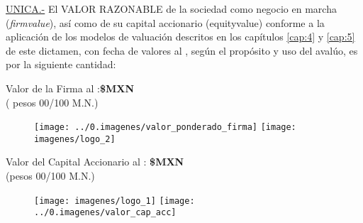 \textcolor{principal}{\underline{UNICA.-}} El \textcolor{principal}{VALOR RAZONABLE} de la sociedad \textcolor{principal}{\empresaSolicitante} como negocio en marcha (\textit{\gls{firmvalue}}), as\'i como de su capital accionario (\gls{equityvalue}) conforme a la aplicaci\'on de los modelos de valuaci\'on descritos en los cap\'itulos \ref{cap:4} y \ref{cap:5}  de este dictamen, con fecha de valores al \fechaValores, seg\'un el prop\'osito y uso del aval\'uo, es por la siguiente cantidad:\\
\begin{center}
\textcolor{principal}{Valor de la Firma al \fechaValoresCorto:}\textbf{\$\valorFirma MXN}\\

(\textcolor{secundario}{\valorFirmaLetra{} pesos 00/100 M.N.})

\begin{figure}[H]
\centering
\texttt{[image: ../0.imagenes/valor\_ponderado\_firma]}\hspace{.5cm} \texttt{[image: imagenes/logo\_2]}\\
\end{figure}


\textcolor{principal}{Valor del Capital Accionario al \fechaValoresCorto:} \textbf{\$\valorCapital MXN}\\
(\textcolor{secundario}{\valorCapitalLetra pesos 00/100 M.N.})\\
\end{center}

\begin{figure}[H]
\centering
\texttt{[image: imagenes/logo\_1]}\hspace{2.1cm} \texttt{[image: ../0.imagenes/valor\_cap\_acc]}

\end{figure}
\espacio{.5cm}

\vspace{2cm}